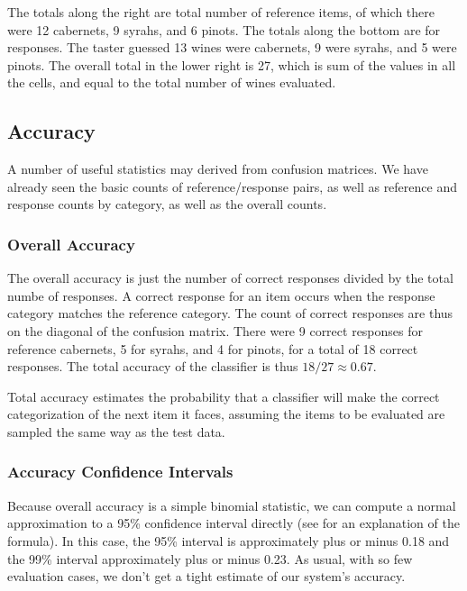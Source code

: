 The totals along the right are total number of reference items, of
which there were 12 cabernets, 9 syrahs, and 6 pinots.  The totals
along the bottom are for responses.  The taster guessed 13 wines were
cabernets, 9 were syrahs, and 5 were pinots.  The overall total in the
lower right is 27, which is sum of the values in all the cells, and
equal to the total number of wines evaluated.

\subsection{Accuracy}

A number of useful statistics may derived from confusion matrices.  We
have already seen the basic counts of reference/response pairs, as
well as reference and response counts by category, as well as the overall counts.

\subsubsection{Overall Accuracy}

The overall accuracy is just the number of correct responses divided
by the total numbe of responses.  A correct response for an item
occurs when the response category matches the reference category.  The
count of correct responses are thus on the diagonal of the confusion
matrix.  There were 9 correct responses for reference cabernets, 5 for
syrahs, and 4 for pinots, for a total of 18 correct responses.  The
total accuracy of the classifier is thus $18/27 \approx 0.67$.  

Total accuracy estimates the probability that a classifier will make
the correct categorization of the next item it faces, assuming the
items to be evaluated are sampled the same way as the test data.

\subsubsection{Accuracy Confidence Intervals} 

Because overall accuracy is a simple binomial statistic, we can
compute a normal approximation to a 95\% confidence interval directly
(see  for an explanation of the
formula).  In this case, the 95\% interval is approximately plus or
minus 0.18 and the 99\% interval approximately plus or minus 0.23.  As
usual, with so few evaluation cases, we don't get a tight estimate of
our system's accuracy.

